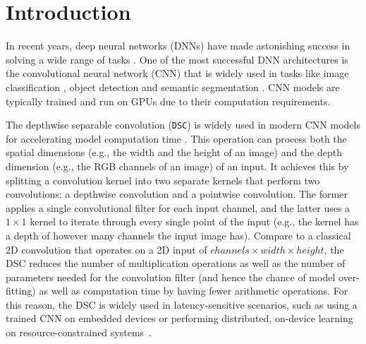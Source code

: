 \section{Introduction\label{sec:intro}}

In recent years, deep neural networks (DNNs) have made astonishing success in solving a wide range of tasks \cite{zoran2020towards,yang2020gated,wang2020rdsnet,chen2020mnasfpn,zhong2020squeeze,tokunaga2019adaptive}. One of the
most successful DNN architectures is the convolutional neural network (CNN) that is widely used in tasks like image classification
\cite{zoran2020towards,yang2020gated}, object detection \cite{wang2020rdsnet,chen2020mnasfpn} and  semantic segmentation \cite{zhong2020squeeze,tokunaga2019adaptive}. CNN models are typically trained and run on
GPUs due to their computation requirements.


The depthwise separable convolution (\texttt{DSC}) is widely used in modern CNN models for accelerating model computation time
\cite{howard2019searching,tan2019efficientnet,haase2020rethinking,zhang2019depth}. This operation can process both the spatial dimensions (e.g., the width and the height of an image) and the depth
dimension (e.g., the RGB channels of an image) of an input. It achieves this by splitting a convolution kernel into two separate kernels
that perform two convolutions: a depthwise convolution and a pointwise convolution. The former applies a single convolutional filter for
each input channel, and the latter uses a $1 \times 1$ kernel to iterate through every single point of the input (e.g., the kernel has a
depth of however many channels the input image has). Compare to a classical 2D convolution that operates on a 2D input of
$channels \times width \times height$, the DSC reduces the number of multiplication operations as well as the number of parameters needed
for the convolution filter (and hence the chance of model over-fitting) as well as computation time by having fewer arithmetic operations.
For this reason, the DSC is widely used in latency-sensitive scenarios, such as using a trained CNN on embedded devices or performing
distributed, on-device learning on resource-constrained systems~\cite{espeholt2019seed}.


